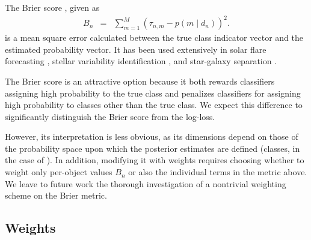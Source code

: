The Brier score \citep{brier_verification_1950}, given as
\begin{eqnarray}
  \label{eq:brier}
B_{n} &=& \sum_{m=1}^{M}(\tau_{n, m}-p(m \mid d_{n}))^{2}.
\end{eqnarray}
is a mean square error calculated between the true class indicator vector and the estimated probability vector.
It has been used extensively in solar flare forecasting \citep{crown_validation_2012, mays_ensemble_2015, florios_forecasting_2018}, stellar variability identification \citep{richards_construction_2012, armstrong_k2_2016}, and star-galaxy separation \citep{kim_hybrid_2015}.

The Brier score is an attractive option because it both rewards classifiers assigning high probability to the true class and penalizes classifiers for assigning high probability to classes other than the true class.
We expect this difference to significantly distinguish the Brier score from the log-loss.

However, its interpretation is less obvious, as its dimensions depend on those of the probability space upon which the posterior estimates are defined (classes, in the case of \plasticc).
In addition, modifying it with weights requires choosing whether to weight only per-object values $B_{n}$ or also the individual terms in the metric above.
We leave to future work the thorough investigation of a nontrivial weighting scheme on the Brier metric.


%

\subsection{Weights}
\label{sec:weights}


